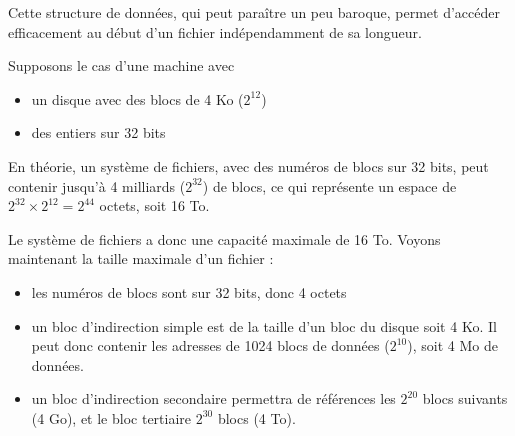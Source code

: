 \begin{multicols}{2}
Cette structure de données, qui peut paraître un peu baroque, permet
d'accéder efficacement au début d'un fichier indépendamment de sa longueur.

Supposons le cas d'une machine avec
\begin{itemize}
\item un disque avec des blocs de 4 Ko ($2^{12}$)
\item des entiers sur 32 bits
\end{itemize}

En théorie, un système de fichiers, avec des numéros de blocs sur 32
bits, peut contenir jusqu'à 4 milliards ($ 2^{32} $) de blocs, ce qui
représente un espace de $ 2^{32} \times 2^{12} = 2^{44} $ octets, soit
16 To.
 

Le système de fichiers a donc une capacité maximale de 16 To. Voyons maintenant la taille maximale d'un fichier :

\begin{itemize}
\item les numéros de blocs sont sur 32 bits, donc 4 octets
\item un bloc d'indirection simple est de la taille d'un bloc du
  disque soit 4 Ko. Il peut donc contenir les adresses de 1024 blocs de données
  ($2^{10}$), soit 4 Mo de données.
\item un bloc d'indirection secondaire permettra de références les $2^{20}$ blocs suivants (4 Go), et le bloc tertiaire $2^{30}$ blocs (4 To).
\end{itemize}









\end{multicols}
